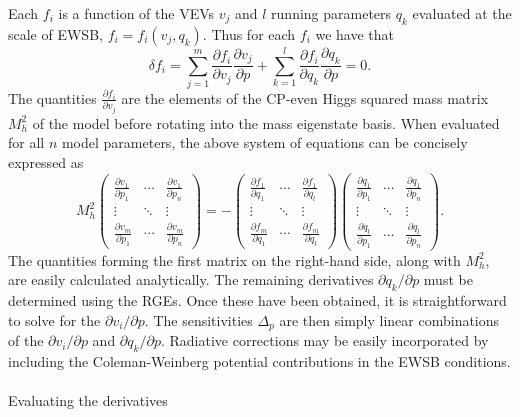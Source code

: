 \documentclass[preprint,amsmath,amssymb,aps,superscriptaddress,prd,showpacs,floatfix,nofootinbib]{revtex4-1}
\begin{document}
Each $f_i$ is a function of the VEVs $v_j$ and $l$ running parameters
$q_k$ evaluated at the scale of EWSB, $f_i=f_i(v_j,q_k)$. Thus for
each $f_i$ we have that
\begin{equation}\label{eq:EWSBchainrule}
\delta f_i = \sum_{j=1}^m \frac{\partial f_i}{\partial
  v_j}\frac{\partial v_j}{\partial p}+\sum_{k=1}^l \frac{\partial
  f_i}{\partial q_k}\frac{\partial q_k}{\partial p}=0.
\end{equation}
The quantities $\frac{\partial f_i}{\partial v_j}$ are the elements of
the CP-even Higgs squared mass matrix $M_h^2$ of the model before
rotating into the mass eigenstate basis. When evaluated for all $n$
model parameters, the above system of equations can be concisely
expressed as
\begin{equation}\label{eq:tuningsystem}
M_h^2\begin{pmatrix}
\frac{\partial v_1}{\partial p_1} & \cdots & \frac{\partial v_1}{\partial p_n} \\
\vdots & \ddots & \vdots \\
\frac{\partial v_m}{\partial p_1} & \cdots & \frac{\partial v_m}{\partial p_n}
\end{pmatrix}=
-\begin{pmatrix}
\frac{\partial f_1}{\partial q_1} & \cdots & \frac{\partial f_1}{\partial q_l} \\
\vdots & \ddots & \vdots \\
\frac{\partial f_m}{\partial q_1} & \cdots & \frac{\partial f_m}{\partial q_l}
\end{pmatrix}
\begin{pmatrix}
\frac{\partial q_1}{\partial p_1} & \cdots & \frac{\partial q_1}{\partial p_n} \\
\vdots & \ddots & \vdots \\
\frac{\partial q_l}{\partial p_1} & \cdots & \frac{\partial q_l}{\partial p_n}
\end{pmatrix}.
\end{equation} 
The quantities forming the first matrix on the right-hand side, along
with $M_h^2$, are easily calculated analytically. The remaining
derivatives $\partial q_k /\partial p$ must be determined using the
RGEs. Once these have been obtained, it is straightforward to solve
for the $\partial v_i /\partial p$. The sensitivities 
$\Delta_p$ are then simply linear combinations of the $\partial
v_i/\partial p$ and $\partial q_k/\partial p$. Radiative corrections
may be easily incorporated by including the Coleman-Weinberg potential
contributions in the EWSB conditions.\\ \\ Evaluating the derivatives
\end{document}
